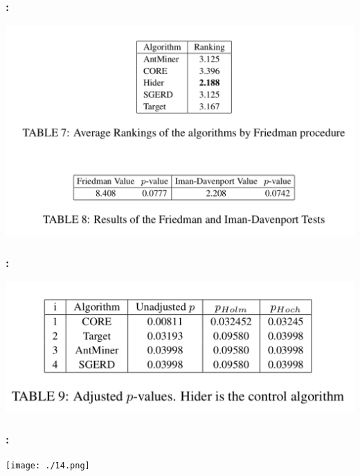\documentclass{beamer}
\begin{document}
\begin{CJK*}{UTF8}{bsmi}
\begin{frame}
	\frametitle{\insertsection : \insertsubsection}
	\begin{center}
		\includegraphics[height=.75\textheight]{./12.png}
	\end{center}
\end{frame}


\begin{frame}
	\frametitle{\insertsection : \insertsubsection}
\begin{center}
\includegraphics[width=1\linewidth]{./13.png}
\end{center}
\end{frame}


\begin{frame}
	\frametitle{\insertsection : \insertsubsection}
	\begin{center}
		\texttt{[image: ./14.png]}
	\end{center}
\end{frame}



\end{CJK*}
\end{document}
